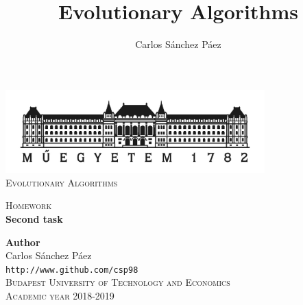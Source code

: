\documentclass[12pt,english]{article}
\title{Evolutionary Algorithms}
\author{Carlos Sánchez Páez}
\begin{document}
\begin{titlepage}

\newlength{\centeroffset}
\setlength{\centeroffset}{-0.5\oddsidemargin}
\addtolength{\centeroffset}{0.5\evensidemargin}
\thispagestyle{empty}

\noindent\hspace*{\centeroffset}
\begin{minipage}{\textwidth}

\centering
\includegraphics[width=0.75\textwidth]{bme_logo.jpg}\\[1.4cm]

\textsc{ \Large Evolutionary Algorithms\\[4cm]}

\textsc{\Huge Homework}\\[0.75cm]

{\Large\bfseries Second task\\}
\end{minipage}

\vspace{8cm}
\noindent\hspace*{\centeroffset}
\begin{minipage}{\textwidth}
\centering

\textbf{Author}\\ {Carlos Sánchez Páez}\\
\texttt{http://www.github.com/csp98}\\[0.5cm]
\textsc{Budapest University of Technology and Economics}\\
\vspace{1cm}
\textsc{Academic year 2018-2019}
\end{minipage}
\end{titlepage}
\thispagestyle{empty}

\newpage
\end{document}
